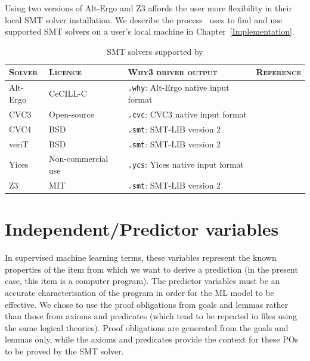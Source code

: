 Using two versions of Alt-Ergo and Z3 affords the user more flexibility in their local SMT solver installation. 
We describe the process \where~uses to find and use supported SMT solvers on a user's local machine in Chapter~\ref{Implementation}. 

\begin{table}
	\caption[SMT solvers supported by \where]{SMT solvers supported by \where}
 
		\begin{tabularx}{\textwidth}{@{}YYYc@{}}
			\toprule
			\textsc{Solver} &  \textsc{Licence} & \textsc{Why3 driver output} & \textsc{Reference} \\
			\midrule
			Alt-Ergo & CeCILL-C & \texttt{.why}: Alt-Ergo native input format & \cite{AltErgo} \\ 
			\midrule
			CVC3 & Open-source & \texttt{.cvc}: CVC3 native input format & \cite{CVC3} \\
			\midrule
			CVC4 & BSD & \texttt{.smt}: SMT-LIB version 2 & \cite{CVC4} \\ 
			\midrule
			veriT & BSD & \texttt{.smt}: SMT-LIB version 2 & \cite{veriT} \\
			\midrule
			Yices & Non-commercial use & \texttt{.ycs}: Yices native input format & \cite{Yices} \\
			\midrule
			Z3 & MIT & \texttt{.smt}: SMT-LIB version 2 & \cite{Z3} \\
			\bottomrule	
			
		\end{tabularx}
	
	\label{table:solvers}
\end{table}


\section{Independent/Predictor variables}
\label{sec:independant}

In supervised machine learning terms, these variables represent the known properties of the item from which we want to derive a prediction (in the present case, this item is a computer program). 
The predictor variables must be an accurate characterisation of the program in order for the ML model to be effective. 
We chose to use the proof obligations from goals and lemmas rather than those from axioms and predicates (which tend to be repeated in files using the same logical theories). 
Proof obligations are generated from the goals and lemmas only, while the axioms and predicates provide the context for these POs to be proved by the SMT solver.

